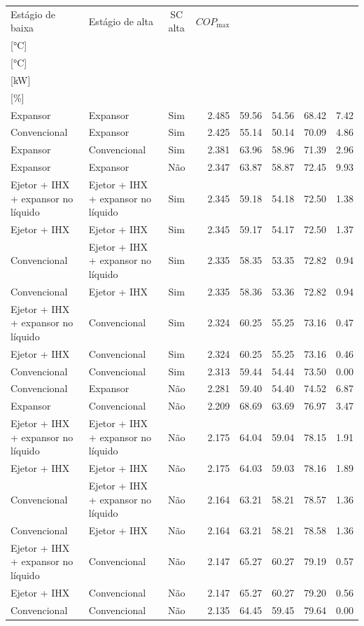 {\small\setlength{\tabcolsep}{4pt}\renewcommand{\arraystretch}{1.12}
\begin{tabular}{llcrrrrr}
\toprule
Estágio de baixa & Estágio de alta & SC alta & $COP_{\max}$ & \shortstack{$T_{\mathrm{cond,l}}^*$\\{[°C]}} & \shortstack{$T_{\mathrm{evap,h}}^*$\\{[°C]}} & \shortstack{$\dot W_{\mathrm{liq}}$\\{[kW]}} & \shortstack{$\Delta COP_{\mathrm{opt}}$\\{[\%]}} \\
\midrule
Expansor & Expansor & Sim & 2.485 & 59.56 & 54.56 & 68.42 & 7.42 \\
Convencional & Expansor & Sim & 2.425 & 55.14 & 50.14 & 70.09 & 4.86 \\
Expansor & Convencional & Sim & 2.381 & 63.96 & 58.96 & 71.39 & 2.96 \\
Expansor & Expansor & Não & 2.347 & 63.87 & 58.87 & 72.45 & 9.93 \\
Ejetor + IHX + expansor no líquido & Ejetor + IHX + expansor no líquido & Sim & 2.345 & 59.18 & 54.18 & 72.50 & 1.38 \\
Ejetor + IHX & Ejetor + IHX & Sim & 2.345 & 59.17 & 54.17 & 72.50 & 1.37 \\
Convencional & Ejetor + IHX + expansor no líquido & Sim & 2.335 & 58.35 & 53.35 & 72.82 & 0.94 \\
Convencional & Ejetor + IHX & Sim & 2.335 & 58.36 & 53.36 & 72.82 & 0.94 \\
Ejetor + IHX + expansor no líquido & Convencional & Sim & 2.324 & 60.25 & 55.25 & 73.16 & 0.47 \\
Ejetor + IHX & Convencional & Sim & 2.324 & 60.25 & 55.25 & 73.16 & 0.46 \\
Convencional & Convencional & Sim & 2.313 & 59.44 & 54.44 & 73.50 & 0.00 \\
Convencional & Expansor & Não & 2.281 & 59.40 & 54.40 & 74.52 & 6.87 \\
Expansor & Convencional & Não & 2.209 & 68.69 & 63.69 & 76.97 & 3.47 \\
Ejetor + IHX + expansor no líquido & Ejetor + IHX + expansor no líquido & Não & 2.175 & 64.04 & 59.04 & 78.15 & 1.91 \\
Ejetor + IHX & Ejetor + IHX & Não & 2.175 & 64.03 & 59.03 & 78.16 & 1.89 \\
Convencional & Ejetor + IHX + expansor no líquido & Não & 2.164 & 63.21 & 58.21 & 78.57 & 1.36 \\
Convencional & Ejetor + IHX & Não & 2.164 & 63.21 & 58.21 & 78.58 & 1.36 \\
Ejetor + IHX + expansor no líquido & Convencional & Não & 2.147 & 65.27 & 60.27 & 79.19 & 0.57 \\
Ejetor + IHX & Convencional & Não & 2.147 & 65.27 & 60.27 & 79.20 & 0.56 \\
Convencional & Convencional & Não & 2.135 & 64.45 & 59.45 & 79.64 & 0.00 \\
\bottomrule
\end{tabular}
}
